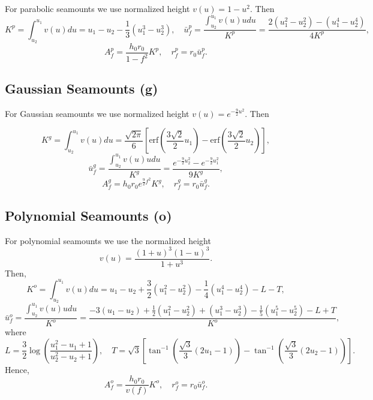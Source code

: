 \documentclass[12pt,letterpaper,margin=0.5in]{report}
\begin{document}
For parabolic seamounts we use normalized height $v(u) = 1 - u^2$. Then
\begin{equation}
K^p = \int_{u_2}^{u_1} v(u) du = u_1 - u_2 - \frac{1}{3}\left ( u_1^3 - u_2^3 \right ), \quad \bar{u}_f^p = \frac{\int_{u_2}^{u_1} v(u) u du}{K^p} = \frac{2(u_1^2 - u_2^2) - (u_1^4 - u_2^4)}{4K^p},
\end{equation}
\begin{equation}
A_f^p = \frac{h_0 r_0}{1-f^2}K^p, \quad r_f^p = r_0\bar{u}_f^p.
\end{equation}

\subsection{Gaussian Seamounts (g)}

For Gaussian seamounts we use normalized height $v(u) = e^{-\frac{9}{2}u^2}$. Then

\begin{equation}
K^g = \int_{u_2}^{u_1} v(u) du = \frac{\sqrt{2\pi}}{6} \left [ \mbox{erf} \left (\frac{3\sqrt{2}}{2}u_1\right ) - \mbox{erf} \left (\frac{3\sqrt{2}}{2}u_2\right ) \right ],
\end{equation}
\begin{equation}
\bar{u}_f^g = \frac{\int_{u_2}^{u_1} v(u) u du}{K^g} = \frac{e^{-\frac{9}{2}u_2^2} - e^{-\frac{9}{2}u_1^2}}{9K^g},
\end{equation}
\begin{equation}
A_f^g = h_0 r_0 e^{\frac{9}{2}f^2} K^g, \quad r_f^g = r_0\bar{u}_f^g.
\end{equation}

\subsection{Polynomial Seamounts (o)}

For polynomial seamounts we use the normalized height
\begin{equation}
v(u) = \frac{(1 + u)^3 (1 - u)^3}{1 + u^3}.
\end{equation}
Then,
\begin{equation}
K^o = \int_{u_2}^{u_1} v(u) du = u_1 - u_2 + \frac{3}{2}\left (u_1^2 - u_2^2 \right ) - \frac{1}{4} \left (u_1^4 - u_2^4\right ) - L - T,
\end{equation}
\begin{equation}
\bar{u}_f^o = \frac{\int_{u_2}^{u_1} v(u) u du}{K^o} = \frac{- 3 (u_1 - u_2) + \frac{1}{2}(u_1^2 - u_2^2) + (u_1^3 - u_2^3) - \frac{1}{5}(u_1^5 - u_2^5) - L + T}{K^o},
\end{equation}
where 
\begin{equation}
L = \frac{3}{2} \log \left ( \frac{u_1^2 - u_1 + 1}{u_2^2 - u_2 + 1}\right ), \quad T = \sqrt{3} \left [ \tan^{-1} \left (\frac{\sqrt{3}}{3}(2u_1 - 1)\right ) - \tan^{-1} \left (\frac{\sqrt{3}}{3}(2u_2 - 1)\right )\right ].
\end{equation}
Hence,
\begin{equation}
A_f^o = \frac{h_0 r_0}{v(f)} K^o, \quad r_f^o = r_0\bar{u}_f^o.
\end{equation}
\end{document}
